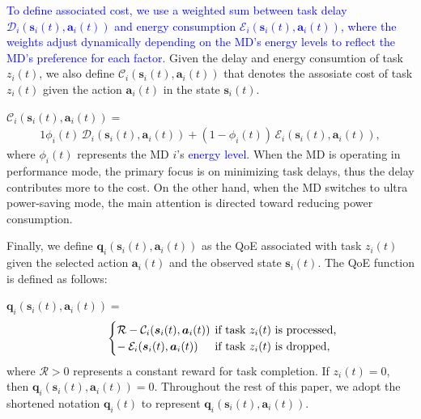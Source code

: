 \documentclass[12pt,draftclsnofoot,onecolumn]{IEEEtran}
\begin{document}
\textcolor{blue}{To define associated cost, we use a weighted sum between task delay $\mathcal{D}_i(\boldsymbol{s}_i(t),\boldsymbol{a}_i(t))$ and energy consumption $\mathcal{E}_i(\boldsymbol{s}_i(t),\boldsymbol{a}_i(t))$, where the weights adjust dynamically depending on the MD's energy levels to reflect the MD's preference for each factor.}
Given the delay and energy consumtion of task $z_i(t)$, we also define $\mathcal{C}_i(\boldsymbol{s}_i(t),\boldsymbol{a}_i(t))$ that denotes the assosiate cost of task $z_i(t)$ given the action $\boldsymbol{a}_i(t)$ in the state $\boldsymbol{s}_i(t)$. \vspace{1.7mm}


$\mathcal{C}_i(\boldsymbol{s}_i(t),\boldsymbol{a}_i(t)) =$
\begin{alignat}{1}
	\phi_i(t) \, \mathcal{D}_i(\boldsymbol{s}_i(t),\boldsymbol{a}_i(t)) +(1-\phi_i(t)) \, \mathcal{E}_i(\boldsymbol{s}_i(t),\boldsymbol{a}_i(t)),
	\label{23}  
\end{alignat}
where $\phi_i(t)$ represents the MD $i$'s \textcolor{blue}{energy level}. When the MD is operating in performance mode, the primary focus is on minimizing task delays, thus the delay contributes more to the cost. On the other hand, when the MD switches to ultra power-saving mode, the main attention is directed toward reducing power consumption.

Finally, we define $\boldsymbol{q}_i(\boldsymbol{s}_i(t),\boldsymbol{a}_i(t))$ as the QoE associated with task $z_i(t)$ given the selected action $\boldsymbol{a}_i(t)$ and the observed state $\boldsymbol{s}_i(t)$. The QoE function is defined as follows:\vspace{1.7mm}

$\boldsymbol{q}_i(\boldsymbol{s}_i(t),\boldsymbol{a}_i(t)) =$
\begin{alignat}{1}
	\hspace*{8mm}
	\begin{cases} 
		\mathcal{R} - \mathcal{C}_i(\boldsymbol{s}_i(t),\boldsymbol{a}_i(t)) & \hspace*{-2mm} \text{if task $z_i(t)$ is processed,} \\
		- \hspace*{0.8mm} \mathcal{E}_i(\boldsymbol{s}_i(t),\boldsymbol{a}_i(t)) &	\hspace*{-2mm} \text{if task $z_i(t)$ is dropped,}
	\end{cases}
	\label{26}  
\end{alignat}
where $\mathcal{R} > 0$ represents a constant reward for task completion. If $z_i(t) = 0$, then $\boldsymbol{q}_i(\boldsymbol{s}_i(t), \boldsymbol{a}_i(t)) = 0$. Throughout the rest of this paper, we adopt the shortened notation $\boldsymbol{q}_i(t)$ to represent $\boldsymbol{q}_i(\boldsymbol{s}_i(t), \boldsymbol{a}_i(t))$.
\end{document}
